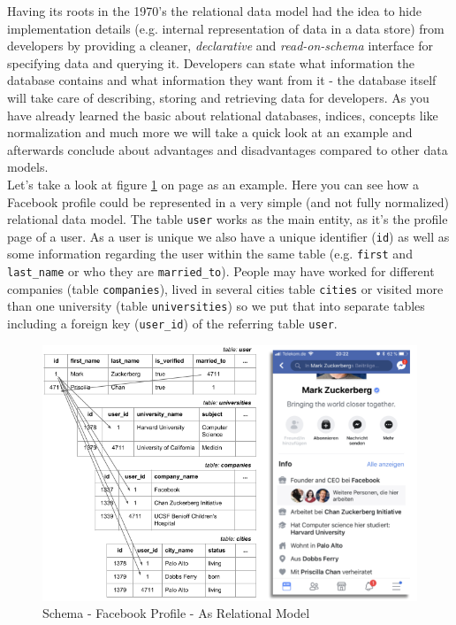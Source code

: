 {Having its roots in the 1970's the relational data model had the idea to hide implementation details (e.g. internal representation of data in a data store) from developers by providing a cleaner, \textit{declarative} and \textit{read-on-schema} interface for specifying data and querying it. Developers can state what information the database contains and what information they want from it - the database itself will take care of describing, storing and retrieving data for developers. As you have already learned the basic about relational databases, indices, concepts like normalization and much more we will take a quick look at an example and afterwards conclude about advantages and disadvantages compared to other data models. \\

Let's take a look at figure \ref{schema_facebook_relational_model} on page \pageref{schema_facebook_relational_model} as an example. Here you can see how a Facebook profile could be represented in a very simple (and not fully normalized) relational data model. 
The table \lstinline{user} works as the main entity, as it's the profile page of a user. As a user is unique we also have a unique identifier (\lstinline{id}) as well as some information regarding the user within the same table (e.g. \lstinline{first} and \lstinline{last_name} or who they are \lstinline{married_to}). 
People may have worked for different companies (table \lstinline{companies}), lived in several cities {table \lstinline{cities}} or visited more than one university (table \lstinline{universities}) so we put that into separate tables including a foreign key (\lstinline{user_id}) of the referring table {\lstinline{user}}.\\

\begin{figure}[ht]
	\centering
  \includegraphics[width=1\textwidth]{relational_model_zuckerberg.png}
	\caption{Schema - Facebook Profile - As Relational Model}
	\label{schema_facebook_relational_model}
\end{figure}

}
